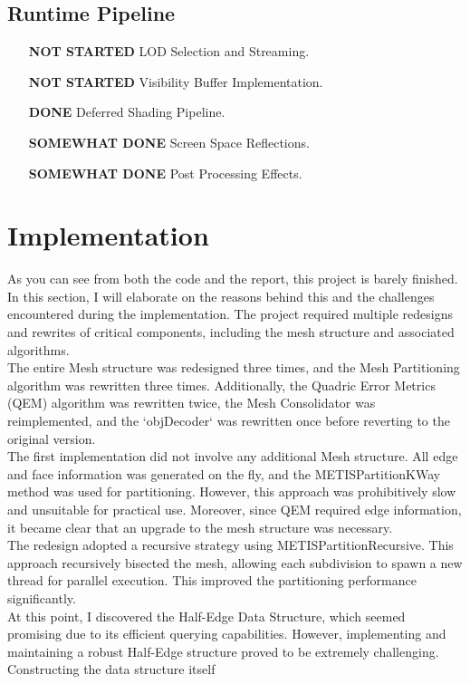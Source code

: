 \documentclass[12pt]{extarticle}
\newcommand{\customnewline}{\\[1.5em]}
\begin{document}
\subsection{Runtime Pipeline}
\begin{enumerate}
    \item [\textbf{NOT STARTED}] LOD Selection and Streaming.
    \item [\textbf{NOT STARTED}] Visibility Buffer Implementation.
    \item [\textbf{DONE}] Deferred Shading Pipeline.
    \item [\textbf{SOMEWHAT DONE}] Screen Space Reflections.
    \item [\textbf{SOMEWHAT DONE}] Post Processing Effects.
\end{enumerate}

\section{Implementation}
As you can see from both the code and the report, this project is barely finished. In this section, I will elaborate on the reasons 
behind this and the challenges encountered during the implementation. The project required multiple redesigns and rewrites of critical 
components, including the mesh structure and associated algorithms.
\customnewline
The entire Mesh structure was redesigned three times, and the Mesh Partitioning algorithm was rewritten three times. Additionally, the 
Quadric Error Metrics (QEM) algorithm was rewritten twice, the Mesh Consolidator was reimplemented, and the `objDecoder` was rewritten 
once before reverting to the original version.
\customnewline
The first implementation did not involve any additional Mesh structure. All edge and face information was generated on the fly, and the 
METISPartitionKWay method was used for partitioning. However, this approach was prohibitively slow and unsuitable for practical use. 
Moreover, since QEM required edge information, it became clear that an upgrade to the mesh structure was necessary. 
\customnewline
The redesign adopted a recursive strategy using METISPartitionRecursive. This approach recursively bisected the mesh, allowing each 
subdivision to spawn a new thread for parallel execution. This improved the partitioning performance significantly.
\customnewline
At this point, I discovered the Half-Edge Data Structure, which seemed promising due to its efficient querying capabilities. However, 
implementing and maintaining a robust Half-Edge structure proved to be extremely challenging. Constructing the data structure itself 
\end{document}
